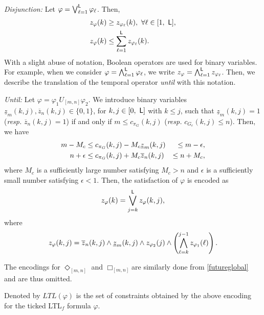 \documentclass{article}
\newcommand{\req}[1]{\eqref{#1}}
\newcommand{\Len}{{\sf L}}
\begin{document}
\textit{Disjunction:} Let $\varphi = \bigvee^{\Len} _{\ell=1} \varphi_\ell$. 
Then, 
\begin{align}
z_\varphi (k) &\geq z_{\varphi_\ell} (k),\ \forall \ell \in [1,\ \Len], \notag \\ 
z_\varphi (k) & \leq \sum_{\ell=1}^{\Len} z_{\varphi_\ell} (k). \notag
\end{align}
With a slight abuse of notation, Boolean operators are used for binary variables. For example, when we consider $\varphi = \bigwedge^\Len _{\ell=1} \varphi_\ell$, we write $z_\varphi = \bigwedge^{\Len} _{\ell=1} z_{\varphi_\ell}$. %
Then, we describe the translation of the temporal operator \textit{until} with this notation.

\textit{Until:} 
Let $\varphi = \varphi_1 U_{[m,n]} \varphi_2$. We introduce binary variables $\underline{z}_m (k, j), \overline{z}_n (k, j) \in \{0, 1\}$, for $k, j \in [0,\ \Len]$ with $k\leq j$,
such that $\underline{z}_m (k,j) = 1$ ({\sl resp.} $\overline{z}_n (k, j) = 1$) if and only if $m \leq c_{\pi_G} (k, j)$ ({\sl resp.} $c_{G_e}(k,j) \leq n$). Then, we have 
\begin{eqnarray}
m - M_c &\leq c_{\pi_G} (k, j) - M_c \underline{z}_m(k,j) &\leq m - \epsilon, \notag\\ 
{n} + \epsilon  &\leq  c_{\pi_G} (k, j) + M_c \overline{z}_n(k,j) &\leq {n}+M_c, \notag
\end{eqnarray}
where $M_c$ is a sufficiently large number satisfying $M_c >n$ and $\epsilon$ is a sufficiently small number satisfying $\epsilon<1$.
Then, the satisfaction of $\varphi$ is encoded as 
\begin{align}%
z_\varphi (k) = \bigvee^{\Len} _{j=k} z_\varphi (k, j),
\end{align}
where 
\begin{align}%
z_\varphi (k, j) = \overline{z}_n (k,j) \wedge  \underline{z}_m (k,j) \wedge z_{\varphi_2} (j) \wedge \left(\bigwedge^{j-1} _{\ell=k} z_{\varphi_1} (\ell) \right).  \notag 
\end{align}

The encodings for $\Diamond_{[m,n]}$ and $\Box_{[m,n]}$are similarly done from  \req{futureglobal} and are thus omitted. 
%

Denoted by $LTL(\varphi)$ is the set of constraints obtained by the above encoding for the ticked LTL$_f$ formula $\varphi$. 



\end{document}
